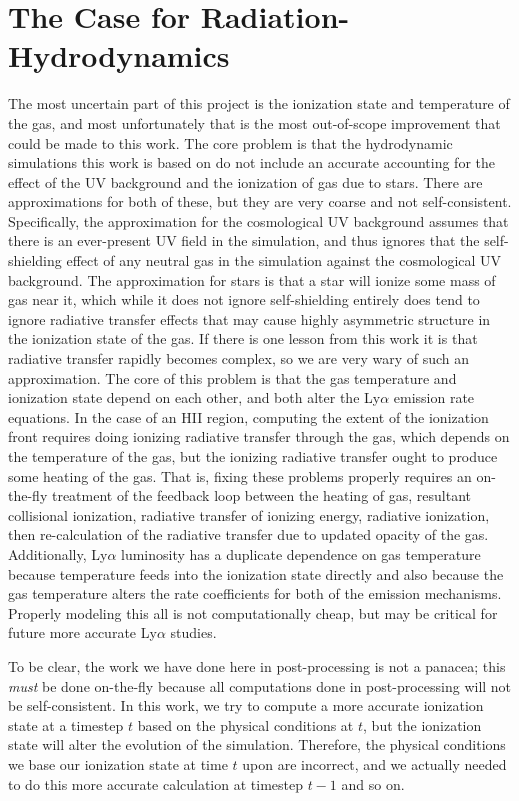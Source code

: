 \section{The Case for Radiation-Hydrodynamics}
The most uncertain part of this project is the ionization state and temperature of the gas, and most unfortunately that is the most out-of-scope improvement that could be made to this work.
The core problem is that the hydrodynamic simulations this work is based on do not include an accurate accounting for the effect of the UV background and the ionization of gas due to stars.
There are approximations for both of these, but they are very coarse and not self-consistent.
Specifically, the approximation for the cosmological UV background assumes that there is an ever-present UV field in the simulation, and thus ignores that the self-shielding effect of any neutral gas in the simulation against the cosmological UV background.
The approximation for stars is that a star will ionize some mass of gas near it, which while it does not ignore self-shielding entirely does tend to ignore radiative transfer effects that may cause highly asymmetric structure in the ionization state of the gas.
If there is one lesson from this work it is that radiative transfer rapidly becomes complex, so we are very wary of such an approximation.
The core of this problem is that the gas temperature and ionization state depend on each other, and both alter the Ly$\alpha$ emission rate equations.
In the case of an HII region, computing the extent of the ionization front requires doing ionizing radiative transfer through the gas, which depends on the temperature of the gas, but the ionizing radiative transfer ought to produce some heating of the gas.
That is, fixing these problems properly requires an on-the-fly treatment of the feedback loop between the heating of gas, resultant collisional ionization, radiative transfer of ionizing energy, radiative ionization, then re-calculation of the radiative transfer due to updated opacity of the gas.
Additionally, Ly$\alpha$ luminosity has a duplicate dependence on gas temperature because temperature feeds into the ionization state directly and also because the gas temperature alters the rate coefficients for both of the emission mechanisms.
Properly modeling this all is not computationally cheap, but may be critical for future more accurate Ly$\alpha$ studies.

To be clear, the work we have done here in post-processing is not a panacea; this \emph{must} be done on-the-fly because all computations done in post-processing will not be self-consistent.
In this work, we try to compute a more accurate ionization state at a timestep $t$ based on the physical conditions at $t$, but the ionization state will alter the evolution of the simulation.
Therefore, the physical conditions we base our ionization state at time $t$ upon are incorrect, and we actually needed to do this more accurate calculation at timestep $t-1$ and so on.


